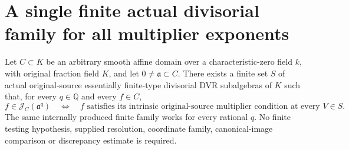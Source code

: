 \section{A single finite actual divisorial family for all multiplier exponents}

\begin{theorem}\label{thm:sc0-finite-divisorial-multiplier-all-exponents}
\leanok
{}
Let $C\subset K$ be an arbitrary smooth affine domain over a
characteristic-zero field $k$, with original fraction field $K$, and let
$0\ne\mathfrak a\subset C$. There exists a finite set $S$ of actual
original-source essentially finite-type divisorial DVR subalgebras of
$K$ such that, for every $q\in\mathbb Q$ and every $f\in C$,
\[
 f\in\mathcal J_C(\mathfrak a^q)
 \quad\Longleftrightarrow\quad
 f\text{ satisfies its intrinsic original-source multiplier condition
 at every }V\in S.
\]
The same internally produced finite family works for every rational $q$.
No finite testing hypothesis, supplied resolution, coordinate family,
canonical-image comparison or discrepancy estimate is required.
\end{theorem}
